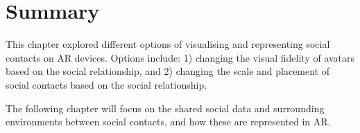 \section{Summary}

This chapter explored different options of visualising and representing social contacts on AR devices. Options include: 1) changing the visual fidelity of avatars based on the social relationship, and 2) changing the scale and placement of social contacts based on the social relationship.

The following chapter will focus on the shared social data and surrounding environments between social contacts, and how these are represented in AR. 